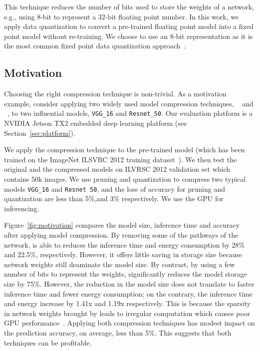  This technique reduces the number of bits used to store the weights of a network, e.g., using 8-bit to
represent a 32-bit floating point number. In this work, we apply data quantization to convert a pre-trained floating point model into a
fixed point model without re-training. We choose to use an 8-bit representation as it is the most common fixed point data quantization
approach~\FIXME{\cite{}}.



\subsection{Motivation}
Choosing the right compression technique is non-trivial. As a motivation example, consider applying two widely used model compression
techniques, \pruning~\cite{manessi2017automated} and \dquantization~\cite{han2015deep}, to two influential \CNN models, \texttt{VGG\_16} 	and
\texttt{Resnet\_50}. Our evaluation platform is a NVIDIA Jetson TX2 embedded deep learning platform (see Section~\ref{sec:platform}).

 We apply the compression technique to the pre-trained model (which has been trained on the ImageNet ILSVRC 2012
training dataset~\cite{imagenet2012}). We then test the original and the compressed models on ILVRSC 2012 validation set which contains 50k images.
We use pruning and quantization to compress two typical models \texttt{VGG\_16} and \texttt{Resnet 50},
and the loss of accuracy for pruning and quantization are less than 5\%,and 3\% respectively.
We use the GPU for
inferencing.

 Figure~\ref{fig:motivation} compares the model size, inference time and accuracy after applying model
compression. By removing some of the pathways of the network, \pruning is able to reduces the inference time and
energy consumption by 28\% and 22.5\%, respectively. However, it offers
little saving in storage size because network weights still deaminate the model size. By contrast, by using a few number of bits to
represent the weights, \quantization significantly reduces the model storage size by 75\%. However, the reduction in the model size does
not translate to faster inference time and fewer energy consumption; 
on the contrary, the inference time and energy increase by 1.41x and 1.19x respectively. 
This is because the sparsity in network
weights brought by \quantization leads to irregular computation which causes poor GPU performance~\cite{}. 
Applying both compression
techniques has modest impact on the prediction accuracy, on average, less than 5\%. This suggests that both techniques can be profitable.

